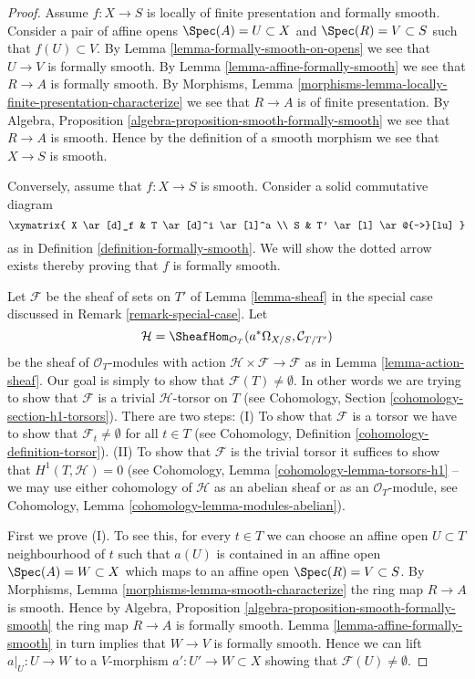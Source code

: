 \begin{proof}
Assume $f : X \to S$ is locally of finite presentation and formally smooth.
Consider a pair of affine opens $\Spec(A) = U \subset X$ and
$\Spec(R) = V \subset S$
such that $f(U) \subset V$. By Lemma \ref{lemma-formally-smooth-on-opens}
we see that $U \to V$ is formally smooth. By Lemma
\ref{lemma-affine-formally-smooth} we see that $R \to A$ is formally
smooth. By
Morphisms, Lemma \ref{morphisms-lemma-locally-finite-presentation-characterize}
we see that $R \to A$ is of finite presentation.
By Algebra, Proposition \ref{algebra-proposition-smooth-formally-smooth}
we see that $R \to A$ is smooth.
Hence by the definition of a smooth morphism we see that $X \to S$ is smooth.

\medskip\noindent
Conversely, assume that $f : X \to S$ is smooth. Consider a solid commutative
diagram
$$
\xymatrix{
X \ar[d]_f & T \ar[d]^i \ar[l]^a \\
S & T' \ar[l] \ar@{-->}[lu]
}
$$
as in Definition \ref{definition-formally-smooth}.
We will show the dotted arrow exists thereby
proving that $f$ is formally smooth.

\medskip\noindent
Let $\mathcal{F}$ be the sheaf of sets on $T'$ of Lemma \ref{lemma-sheaf}
in the special case discussed in Remark \ref{remark-special-case}.
Let
$$
\mathcal{H} =
\SheafHom_{\mathcal{O}_T}(a^*\Omega_{X/S}, \mathcal{C}_{T/T'})
$$
be the sheaf of $\mathcal{O}_T$-modules with action
$\mathcal{H} \times \mathcal{F} \to \mathcal{F}$ as in
Lemma \ref{lemma-action-sheaf}. Our goal is simply
to show that $\mathcal{F}(T) \not = \emptyset$. In other words we
are trying to show that $\mathcal{F}$ is a trivial $\mathcal{H}$-torsor
on $T$ (see Cohomology, Section \ref{cohomology-section-h1-torsors}).
There are two steps: (I) To show that $\mathcal{F}$ is a torsor
we have to show that $\mathcal{F}_t \not = \emptyset$ for all $t \in T$ (see
Cohomology, Definition \ref{cohomology-definition-torsor}).
(II) To show that $\mathcal{F}$ is the trivial torsor it suffices
to show that $H^1(T, \mathcal{H}) = 0$ (see
Cohomology, Lemma \ref{cohomology-lemma-torsors-h1} --
we may use either cohomology
of $\mathcal{H}$ as an abelian sheaf or as an $\mathcal{O}_T$-module,
see Cohomology, Lemma \ref{cohomology-lemma-modules-abelian}).

\medskip\noindent
First we prove (I). To see this, for every $t \in T$ we can
choose an affine open $U \subset T$ neighbourhood of $t$
such that $a(U)$ is contained
in an affine open $\Spec(A) = W \subset X$
which maps to an affine open $\Spec(R) = V \subset S$.
By Morphisms, Lemma \ref{morphisms-lemma-smooth-characterize}
the ring map $R \to A$ is smooth.
Hence by Algebra, Proposition \ref{algebra-proposition-smooth-formally-smooth}
the ring map $R \to A$ is formally smooth.
Lemma \ref{lemma-affine-formally-smooth}
in turn implies that $W \to V$ is formally smooth.
Hence we can lift $a|_U : U \to W$ to a $V$-morphism
$a' : U' \to W \subset X$ showing that $\mathcal{F}(U) \not = \emptyset$.


\end{proof}
